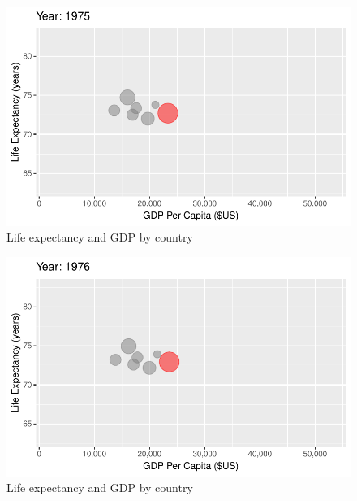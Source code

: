 \documentclass[
  letterpaper,
  DIV=11,
  numbers=noendperiod]{scrreport}
\theoremstyle{definition}
\theoremstyle{remark}
\begin{document}
\begin{figure}

{\centering \includegraphics{index_files/figure-pdf/fig-anim-country-43.pdf}

}

\caption{\label{fig-anim-country-43}Life expectancy and GDP by country}

\end{figure}

\begin{figure}

{\centering \includegraphics{index_files/figure-pdf/fig-anim-country-44.pdf}

}

\caption{\label{fig-anim-country-44}Life expectancy and GDP by country}

\end{figure}
\end{document}
